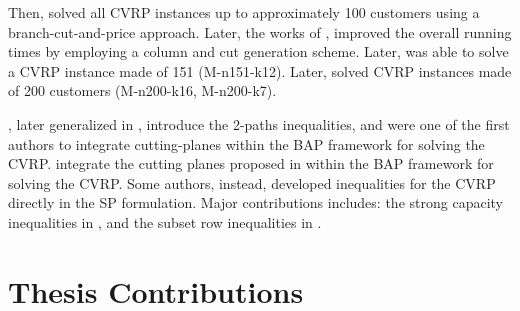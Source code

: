 Then, \textcite{fukasawa2006} solved all CVRP instances up to approximately 100 customers
using a branch-cut-and-price approach.
Later, the works of \textcite{baldacci2008}, \textcite{baldacci2011}
improved the overall running times by employing a column and cut generation scheme.
Later, \textcite{contardo2014} was able to solve a CVRP instance made of 151 (M-n151-k12).
Later, \textcite{pecin2017} solved CVRP instances made of 200 customers (M-n200-k16, M-n200-k7).


\textcite{kohl1999}, later generalized in \cite{desaulniers2008}, introduce the
2-paths inequalities, and were one of the first authors to integrate
cutting-planes within the BAP framework for solving the CVRP.
\textcite{fukasawa2006} integrate the cutting planes proposed in \cite{lysgaard2004}
within the BAP framework for solving the CVRP.
Some authors, instead, developed inequalities for the CVRP directly
in the SP formulation.
Major contributions includes: the strong capacity inequalities in \textcite{baldacci2008},
and the subset row inequalities in \textcite{jepsen2011}.




\begin{comment}
\cite{jepsen_branch-and-cut_2011}

Before 1980 very few exact algorithms for cvrp and vrptw had been
proposed, but in the early 1980s two new exact methods where proposed.
From this point the history of exact methods for cvrp and vrptw can
be divided into three phases. The first phase was the introduction of the
Set Partition and the development of Branch-and-Cut-and-Price (bp) algo-
rithms using a relaxed pricing problem. The second was the development of
Branch-and-Cut (bac) algorithms. In the current phase the pricing problem
is no longer relaxed and cuts in the master problem of the Branch-and-Cut-
and-Price algorithms is used. The first two phases where started at the same
point in time and there is still development on the algorithms in the context
of cvrp and vrptw. The algorithms from these two phases are also used
on several other variants of the Vehicle Routing Problem. The third phase
was started in the middle of the 2000s and the algorithms from this phase
are currently the best overall performing algorithms.
\end{comment}

\section{Thesis Contributions}
\label{sec:intro-thesis-contributions}

